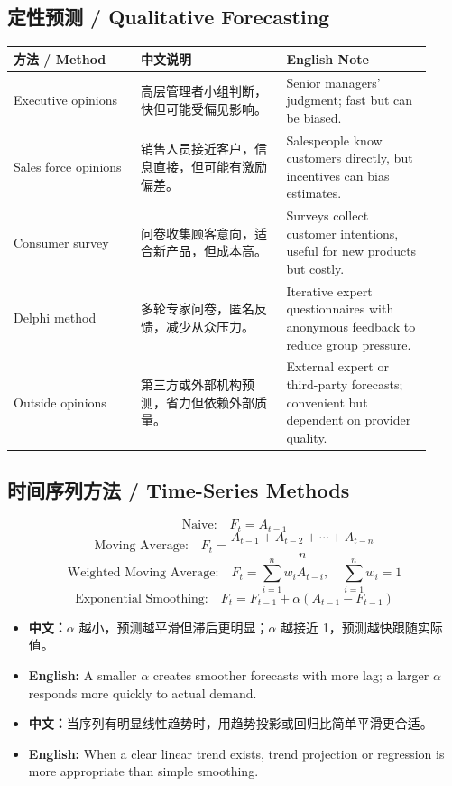 \documentclass[11pt,a4paper]{ctexart}
\newcommand{\cn}[1]{\textbf{中文：}#1}
\newcommand{\en}[1]{\textbf{English:} #1}
\begin{document}
\subsection{定性预测 / Qualitative Forecasting}
\begin{longtable}{L{0.28\linewidth}L{0.32\linewidth}L{0.32\linewidth}}
\toprule
\textbf{方法 / Method} & \textbf{中文说明} & \textbf{English Note} \\
\midrule
Executive opinions & 高层管理者小组判断，快但可能受偏见影响。 & Senior managers' judgment; fast but can be biased. \\
Sales force opinions & 销售人员接近客户，信息直接，但可能有激励偏差。 & Salespeople know customers directly, but incentives can bias estimates. \\
Consumer survey & 问卷收集顾客意向，适合新产品，但成本高。 & Surveys collect customer intentions, useful for new products but costly. \\
Delphi method & 多轮专家问卷，匿名反馈，减少从众压力。 & Iterative expert questionnaires with anonymous feedback to reduce group pressure. \\
Outside opinions & 第三方或外部机构预测，省力但依赖外部质量。 & External expert or third-party forecasts; convenient but dependent on provider quality. \\
\bottomrule
\end{longtable}

\subsection{时间序列方法 / Time-Series Methods}
\[
\text{Naive:}\quad F_t=A_{t-1}
\]
\[
\text{Moving Average:}\quad F_t=\frac{A_{t-1}+A_{t-2}+\cdots+A_{t-n}}{n}
\]
\[
\text{Weighted Moving Average:}\quad F_t=\sum_{i=1}^{n}w_i A_{t-i},\quad \sum_{i=1}^{n}w_i=1
\]
\[
\text{Exponential Smoothing:}\quad F_t=F_{t-1}+\alpha(A_{t-1}-F_{t-1})
\]

\begin{itemize}
  \item \cn{$\alpha$ 越小，预测越平滑但滞后更明显；$\alpha$ 越接近 1，预测越快跟随实际值。}
  \item \en{A smaller $\alpha$ creates smoother forecasts with more lag; a larger $\alpha$ responds more quickly to actual demand.}
  \item \cn{当序列有明显线性趋势时，用趋势投影或回归比简单平滑更合适。}
  \item \en{When a clear linear trend exists, trend projection or regression is more appropriate than simple smoothing.}
\end{itemize}
\end{document}
